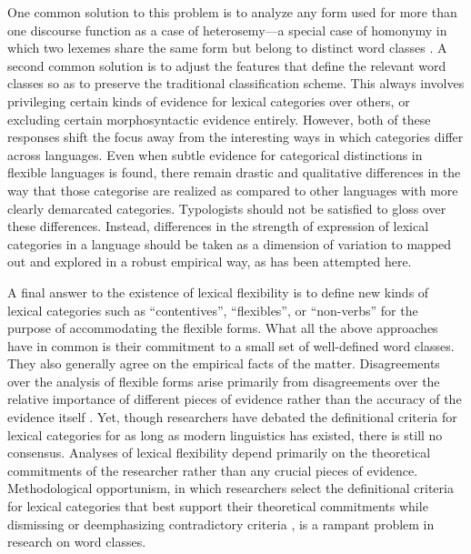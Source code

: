 One common solution to this problem is to analyze any form used for more than one discourse function as a case of heterosemy—a special case of homonymy in which two lexemes share the same form but belong to distinct word classes \parencite{Lichtenberk1991}. A second common solution is to adjust the features that define the relevant word classes so as to preserve the traditional classification scheme. This always involves privileging certain kinds of evidence for lexical categories over others, or excluding certain morphosyntactic evidence entirely. However, both of these responses shift the focus away from the interesting ways in which categories differ across languages. Even when subtle evidence for categorical distinctions in flexible languages is found, there remain drastic and qualitative differences in the way that those categorise are realized as compared to other languages with more clearly demarcated categories. Typologists should not be satisfied to gloss over these differences. Instead, differences in the strength of expression of lexical categories in a language should be taken as a dimension of variation to mapped out and explored in a robust empirical way, as has been attempted here.

A final answer to the existence of lexical flexibility is to define new kinds of lexical categories such as \enquote{contentives}, \enquote{flexibles}, or \enquote{non-verbs} \parencites{HengeveldRijkhoff2005}{Luuk2010} for the purpose of accommodating the flexible forms. What all the above approaches have in common is their commitment to a small set of well-defined word classes. They also generally agree on the empirical facts of the matter. Disagreements over the analysis of flexible forms arise primarily from disagreements over the relative importance of different pieces of evidence rather than the accuracy of the evidence itself \parencites[235]{Wetzer1992}[32]{Stassen1997}[58]{CroftLier2012}. Yet, though researchers have debated the definitional criteria for lexical categories for as long as modern linguistics has existed, there is still no consensus. Analyses of lexical flexibility depend primarily on the theoretical commitments of the researcher rather than any crucial pieces of evidence. Methodological opportunism, in which researchers select the definitional criteria for lexical categories that best support their theoretical commitments while dismissing or deemphasizing contradictory criteria \parencite[30]{Croft2001b}, is a rampant problem in research on word classes.

